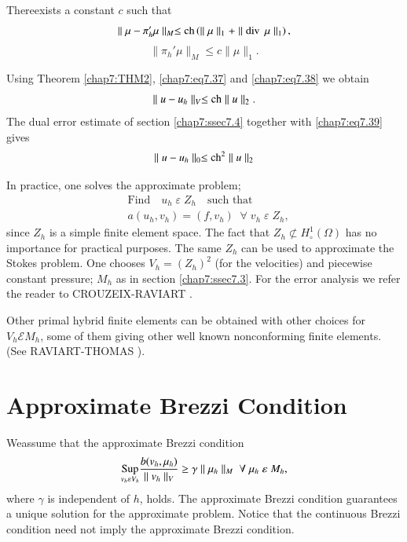 \setcounter{THM}{5}
\begin{THM}\label{chap7:THM6}
There\pageoriginale exists a constant $c$ such that 
\begin{equation}\label{chap7:eq7.38}
\parallel\mu-\pi_h'\mu\parallel_M\leq\operatorname{ch}\left(\parallel\mu\parallel_1
+\parallel\operatorname{div} \;\mu\parallel_1\right),
\end{equation}
$$
\parallel\pi_h'\mu\parallel_M\leq c\parallel\mu\parallel_1.
$$

Using Theorem \ref{chap7:THM2}, \eqref{chap7:eq7.37} and
\eqref{chap7:eq7.38} we obtain 
\begin{equation}\label{chap7:eq7.39}
\parallel u-u_h\parallel_V\leq\operatorname{ch}\parallel u\parallel_2.
\end{equation}
The dual error estimate of section \ref{chap7:ssec7.4} together with
\eqref{chap7:eq7.39} gives 
\begin{equation}\label{chap7:eq7.40}
\parallel u-u_h\parallel_0\leq\operatorname{ch}^2\parallel u\parallel_2
\end{equation}
\end{THM}

\begin{REM}\label{chap7:rem5}
In practice, one solves the approximate problem;
\begin{align*}
&\text{Find}\quad u_h\;\varepsilon \;Z_h\quad\text{such that}\\
&a(u_h,v_h)=(f,v_h)\; \; \forall \;v_h\;\varepsilon \;Z_h,
\end{align*}
since $Z_h$ is a simple finite element space. The fact that
$Z_h\nsubset H_\circ^1(\Omega)$ has no importance for practical
purposes. The same $Z_h$ can be used to approximate the Stokes
problem. One chooses $V_h=(Z_h)^2$ (for the velocities) and piecewise
constant pressure; \ie $M_h$ as in section \ref{chap7:ssec7.3}. For the
error analysis we refer the reader to CROUZEIX-RAVIART \cite{key14}. 
\end{REM}

\begin{REM}\label{chap7:rem6}
Other primal hybrid finite elements can be obtained with other choices
for $V_h\mathscr{E} M_h$, some of them giving other well known
nonconforming finite elements. (See RAVIART-THOMAS \cite{key37}).
\end{REM}

\section{Approximate Brezzi Condition} \label{chap7:ssec7.6}
We\pageoriginale assume that the approximate Brezzi condition 
\begin{equation}\label{chap7:eq7.41}
\underset{v_h\varepsilon V_h}{\operatorname{Sup}}\frac{b(v_h,\mu_h)}{\parallel v_h
\parallel_V}\geq \gamma\parallel\mu_h\parallel_M\;\forall \;\mu_h
\;\varepsilon \;M_h,
\end{equation}
where $\gamma$ is independent of $h$, holds. The approximate Brezzi
condition guarantees a unique solution for the approximate
problem. Notice that the continuous Brezzi condition need not imply
the approximate Brezzi condition.

